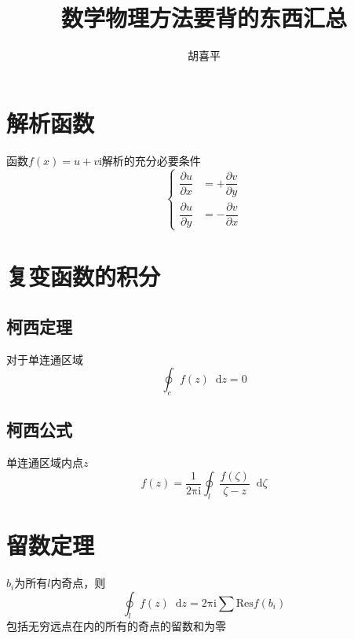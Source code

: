 \documentclass{article}
\author{胡喜平}
\title{数学物理方法要背的东西汇总}
\newcommand*{\md}{\mathop{}\!\mathrm{d}}
\begin{document}
\maketitle

\section{解析函数}

函数$f(x) = u + v \mathrm{i}$解析的充分必要条件
\begin{equation*}
  \left\{
  \begin{aligned}
    \dfrac{\partial u}{\partial x} &= + \dfrac{\partial v}{\partial y} \\
    \dfrac{\partial u}{\partial y} &= - \dfrac{\partial v}{\partial x} 
  \end{aligned}
  \right.
\end{equation*}

\section{复变函数的积分}

\subsection{柯西定理}
对于单连通区域
\begin{equation*}
  \oint_{c} f(z) \md z = 0
\end{equation*}

\subsection{柯西公式}

单连通区域内点$z$
\begin{equation*}
  f(z) = \dfrac{1}{2 \mathrm{\pi} \mathrm{i}} \oint_{l} \dfrac{f(\zeta)}{\zeta - z} \md \zeta
\end{equation*}

\section{留数定理}

$b_{i}$为所有$l$内奇点，则
\begin{equation*}
  \oint_{l} f(z) \md z = 2 \mathrm{\pi} \mathrm{i} \sum\limits \mathrm{Res}f(b_{i})
\end{equation*}
包括无穷远点在内的所有的奇点的留数和为零
\end{document}
